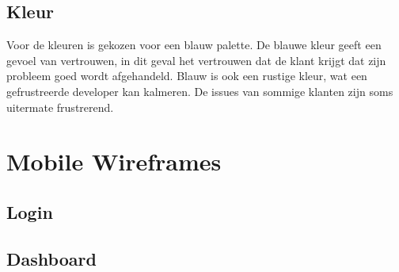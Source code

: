 \documentclass[11pt,english]{article}
\begin{document}
  \subsection{Kleur}
  Voor de kleuren is gekozen voor een blauw palette. De blauwe kleur geeft een
  gevoel van vertrouwen, in dit geval het vertrouwen dat de klant krijgt dat
  zijn probleem goed wordt afgehandeld. Blauw is ook een rustige kleur, wat een
  gefrustreerde developer kan kalmeren. De issues van sommige klanten zijn soms
  uitermate frustrerend.

  \section{Mobile Wireframes}
  \subsection{Login}

  \subsection{Dashboard}
\end{document}

